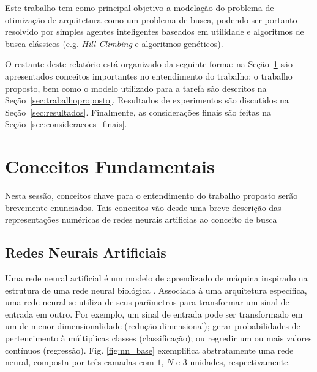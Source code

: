 \documentclass[twoside,conference,a4paper,12px]{IEEEtran}
\begin{document}
Este trabalho tem como principal objetivo a modelação do problema de otimização de arquitetura como um problema de busca, podendo ser portanto resolvido por simples agentes inteligentes baseados em utilidade e algoritmos de busca clássicos (e.g. \textit{Hill-Climbing} e algoritmos genéticos).

O restante deste relatório está organizado da seguinte forma: na Seção~\ref{sec:conceitos} são apresentados conceitos importantes no entendimento do trabalho; o trabalho proposto, bem como o modelo utilizado para a tarefa são descritos na Seção~\ref{sec:trabalhoproposto}. Resultados de experimentos são discutidos na Seção~\ref{sec:resultados}. Finalmente, as considerações finais são feitas na Seção~\ref{sec:consideracoes_finais}.

\section{Conceitos Fundamentais}
\label{sec:conceitos}

Nesta sessão, conceitos chave para o entendimento do trabalho proposto serão brevemente enunciados. Tais conceitos vão desde uma breve descrição das representações numéricas de redes neurais artificias ao conceito de busca

\subsection{Redes Neurais Artificiais}

Uma rede neural artificial é um modelo de aprendizado de máquina inspirado na estrutura de uma rede neural biológica \cite{yegnanarayana2009artificial}. Associada à uma arquitetura específica, uma rede neural se utiliza de seus parâmetros para transformar um sinal de entrada em outro. Por exemplo, um sinal de entrada pode ser transformado em um de menor dimensionalidade (redução dimensional); gerar probabilidades de pertencimento à múltiplicas classes (classificação); ou regredir um ou mais valores contínuos (regressão). Fig. \ref{fig:nn_base} exemplifica abstratamente uma rede neural, composta por três camadas com $1$, $N$ e $3$ unidades, respectivamente.
\end{document}
